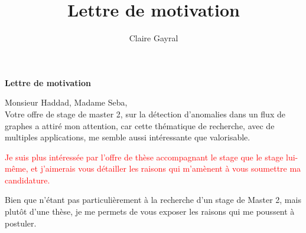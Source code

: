 \documentclass[a4paper,11pt]{article}
\title{Lettre de motivation}
\author{Claire Gayral}
\date{}
\begin{document}
{\centering \Large \bf Lettre de motivation \\ \vspace{0.6cm} }

Monsieur Haddad, Madame Seba,\\

Votre offre de stage de master 2, sur la détection d’anomalies dans un flux de graphes a attiré mon attention, car cette thématique de recherche, avec de multiples applications, me semble aussi intéressante que valorisable.

\textcolor{red}{Je suis plus intéressée par l'offre de thèse accompagnant le stage que le stage lui-même, et j'aimerais vous détailler les raisons qui m'amènent à vous soumettre ma candidature.}

Bien que n'étant pas particulièrement à la recherche d'un stage de Master 2, mais plutôt d'une thèse, 
je me permets de vous exposer les raisons qui me poussent à postuler.%
\end{document}
